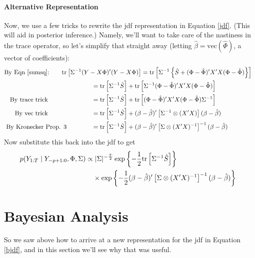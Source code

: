 \documentclass[a4paper,12pt]{scrartcl}
\begin{document}
\paragraph{Alternative Representation}
Now, we use a few tricks to rewrite the jdf representation
in Equation \ref{jdf}. (This will aid in posterior inference.)
Namely, we'll want to take care
of the nastiness in the trace operator, so let's simplify 
that straight away (letting $\hat{\beta} = 
\text{vec}(\hat{\Phi})$, a vector of coefficients):
\begin{align*}
    \text{By Eqn \ref{sumsq}:} \qquad 
	\text{tr} & \left[\Sigma^{-1} 
	(Y - X\Phi)'(Y-X\Phi)\right] = 
	\text{tr} \left[\Sigma^{-1} \left\{
	\hat{S} + (\Phi - \hat{\Phi})'
	X'X(\Phi - \hat{\Phi}) \right\}\right]  \\
    &\qquad\qquad= \text{tr} \left[\Sigma^{-1} 
	\hat{S} \right] + \text{tr} \left[ \Sigma^{-1}
	(\Phi - \hat{\Phi})'X'X(\Phi - \hat{\Phi}) \right] \\
    \text{By trace trick} \qquad \quad
	&\qquad\qquad= \text{tr} \left[\Sigma^{-1}
	\hat{S} \right] + \text{tr} \left[ 
	(\Phi - \hat{\Phi})'X'X(\Phi - \hat{\Phi})
	\Sigma^{-1} \right] \\
    \text{By vec trick} \qquad \quad
	&\qquad\qquad= \text{tr} \left[\Sigma^{-1}
	\hat{S} \right] + 
	(\beta - \hat{\beta})'
	\left[\Sigma^{-1} \otimes (X'X)\right] 
	(\beta - \hat{\beta}) \\
    \text{By Kronecker Prop. 3}  
	&\qquad\qquad= \text{tr} \left[\Sigma^{-1}
	\hat{S} \right] + 
	(\beta - \hat{\beta})'
	\left[\Sigma \otimes (X'X)^{-1}\right]^{-1} 
	(\beta - \hat{\beta}) 
\end{align*}
Now substitute this back into the jdf to get
\begin{align}
    p(Y_{1:T} \; | \; Y_{-p+1:0}, \Phi, \Sigma)
    \propto 
	&\;|\Sigma|^{-\frac{T}{2}} 
	\exp\left\{ -\frac{1}{2} \text{tr} \left[\Sigma^{-1}
	\hat{S} \right] \right\} \notag \\
    &\times
	\exp\left\{ -\frac{1}{2} 
	(\beta - \hat{\beta})'
	\left[\Sigma \otimes (X'X)^{-1}\right]^{-1} 
	(\beta - \hat{\beta}) 
	\right\}  \label{bjdf}
\end{align}


\newpage
\section{Bayesian Analysis}

So we saw above how to arrive at a new representation
for the jdf in Equation \ref{bjdf}, and in this section 
we'll see why that was useful.
\end{document}
